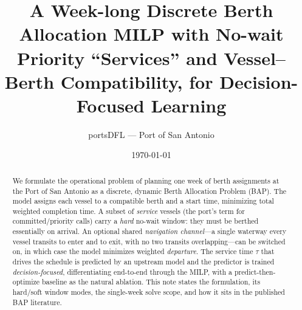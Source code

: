 \documentclass[11pt]{article}
\title{A Week-long Discrete Berth Allocation MILP with No-wait Priority
``Services'' and Vessel--Berth Compatibility, for Decision-Focused Learning}
\author{portsDFL --- Port of San Antonio}
\date{\today}
\begin{document}
\maketitle

\begin{abstract}
We formulate the operational problem of planning one week of berth assignments
at the Port of San Antonio as a discrete, dynamic Berth Allocation Problem
(BAP). The model assigns each vessel to a compatible berth and a start time,
minimizing total weighted completion time. A subset of \emph{service} vessels
(the port's term for committed/priority calls) carry a \emph{hard} no-wait
window: they must be berthed essentially on arrival. An optional shared
\emph{navigation channel}---a single waterway every vessel transits to enter and
to exit, with no two transits overlapping---can be switched on, in which case the
model minimizes weighted \emph{departure}. The service time
$\tau$ that drives the schedule is predicted by an upstream model and the
predictor is trained \emph{decision-focused}, differentiating end-to-end
through the MILP, with a predict-then-optimize baseline as the natural
ablation. This note states the formulation, its hard/soft window modes, the
single-week solve scope, and how it sits in the published BAP literature.
\end{abstract}

\begin{center}
\end{center}
\end{document}
